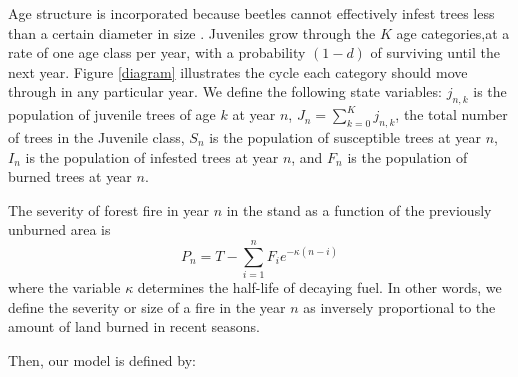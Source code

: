 Age structure is incorporated because beetles cannot effectively infest trees less than a certain diameter in size \cite{safranyik2003mountain, alfaro2003dendroecological}. Juveniles grow through the $K$ age categories,at a rate of one age class per year, with a  probability $(1-d)$ of surviving until the next year. Figure \ref{diagram} illustrates the cycle each category should move through in any particular year.  We define the following state variables: $j_{n,k}$ is the population of juvenile trees of age $k$ at year $n$, $J_n = \sum_{k = 0}^{K} j_{n,k}$, the total number of trees in the Juvenile class, $S_n$ is the population of susceptible trees at year $n$, $I_n$ is the population of infested trees at year $n$, and $F_n$ is the population of burned trees at year $n$.

The severity of forest fire in year $n$ in the stand as a function of the previously unburned area is
\begin{equation}
P_n = T -\sum_{i=1}^{n}  F_i e^{-\kappa (n - i)}
\end{equation}
where the variable $\kappa$ determines the half-life of decaying fuel. In other words, we define the severity or size of a fire in the year $n$ as inversely proportional to the amount of land burned in recent seasons.

Then, our model is defined by:

